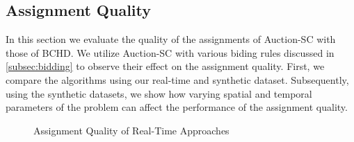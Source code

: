 \subsection{Assignment Quality}
In this section we evaluate the quality of the assignments of Auction-SC with those of BCHD. We utilize Auction-SC with various biding rules discussed in \cref{subsec:bidding} to observe their effect on the assignment quality. First, we compare the algorithms using our real-time and synthetic dataset. Subsequently, using the synthetic datasets, we show how varying spatial and temporal parameters of the problem can affect the performance of the assignment quality.

\begin{figure}[h]
    \centering
    \vspace{-0.15in}
    \caption{Assignment Quality of Real-Time Approaches}
    \label{fig:quality}
\end{figure}

